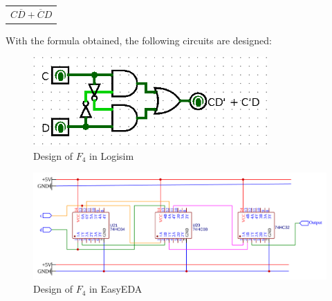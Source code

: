 \documentclass[pdftex,12pt,a4paper]{article}
\begin{document}
\begin{itemize}
\begin{center}
\begin{tabular}{c}
     $ C\overline{D} + \overline{C}D $
  \end{tabular}
\end{center}

With the formula obtained, the following circuits are designed:

\begin{figure}[H]
    \centering
        \includegraphics[width=0.8\textwidth]{Logisim_part_4.png}	
        \caption{Design of \textbf{$F_4$} in Logisim}
   \end{figure}
   
	\begin{figure}[H]
    \centering
        \includegraphics[width=\textwidth]{EasyEDA_part_4.png}	
        \caption{Design of \textbf{$F_4$} in EasyEDA}        
	\end{figure}  

\end{itemize}
\end{document}
